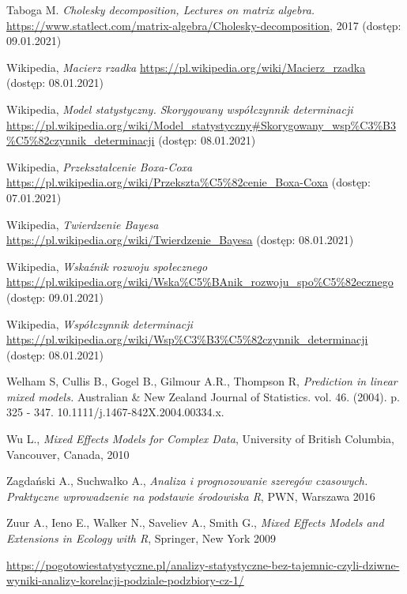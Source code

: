 \documentclass[12pt]{mwbk}
\theoremstyle{plain}
\theoremstyle{definition}
\theoremstyle{definition}
\begin{document}
\begin{thebibliography}{99}
 Taboga M. \emph{Cholesky decomposition, Lectures on matrix algebra.} \url{https://www.statlect.com/matrix-algebra/Cholesky-decomposition}, 2017 (dostęp: 09.01.2021)

 Wikipedia, \emph{Macierz rzadka} \url{https://pl.wikipedia.org/wiki/Macierz_rzadka} (dostęp: 08.01.2021)

 Wikipedia, \emph{Model statystyczny. Skorygowany współczynnik determinacji} \url{https://pl.wikipedia.org/wiki/Model\_statystyczny#Skorygowany\_wsp\%C3\%B3\%C5\%82czynnik\_determinacji} (dostęp: 08.01.2021)

 Wikipedia, \emph{Przekształcenie Boxa-Coxa} \url{https://pl.wikipedia.org/wiki/Przekszta\%C5\%82cenie\_Boxa-Coxa} (dostęp: 07.01.2021)

 Wikipedia, \emph{Twierdzenie Bayesa} \url{https://pl.wikipedia.org/wiki/Twierdzenie_Bayesa} (dostęp: 08.01.2021)

 Wikipedia, \emph{Wskaźnik rozwoju społecznego} \url{https://pl.wikipedia.org/wiki/Wska\%C5\%BAnik\_rozwoju\_spo\%C5\%82ecznego} (dostęp: 09.01.2021)

 Wikipedia, \emph{Współczynnik determinacji} \url{https://pl.wikipedia.org/wiki/Wsp\%C3\%B3\%C5\%82czynnik\_determinacji} (dostęp: 08.01.2021)

 Welham S, Cullis B., Gogel B.,  Gilmour A.R.,  Thompson R, \emph{Prediction in linear mixed models.} Australian \& New Zealand Journal of Statistics. vol. 46.  (2004). p.  325 - 347. 10.1111/j.1467-842X.2004.00334.x. 

 Wu L., \emph{Mixed Effects Models for Complex Data}, University of British Columbia, Vancouver, Canada, 2010

 Zagdański A., Suchwałko A., \emph{Analiza i prognozowanie szeregów czasowych. Praktyczne wprowadzenie na podstawie środowiska R}, PWN, Warszawa 2016

 Zuur A., Ieno E., Walker N.,
Saveliev A., Smith G., \emph{Mixed Effects Models and Extensions in Ecology with R}, Springer, New York 2009

 \url{https://pogotowiestatystyczne.pl/analizy-statystyczne-bez-tajemnic-czyli-dziwne-wyniki-analizy-korelacji-podziale-podzbiory-cz-1/}

\end{thebibliography}



\listoffigures
\end{document}
